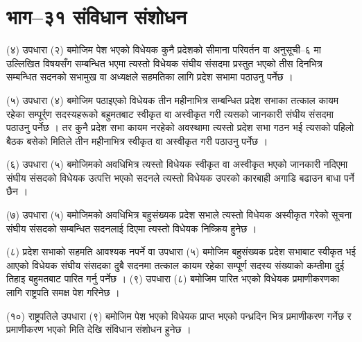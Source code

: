 \section{भाग–३१ संविधान संशोधन}

(४) उपधारा (२) बमोजिम पेश भएको विधेयक कुनै प्रदेशको सीमाना परिवर्तन वा अनुसूची–६ मा उल्लिखित विषयसँग सम्बन्धित भएमा त्यस्तो विधेयक संघीय संसदमा प्रस्तुत भएको तीस दिनभित्र सम्बन्धित सदनको सभामुख वा अध्यक्षले सहमतिका लागि प्रदेश सभामा पठाउनु पर्नेछ ।

(५) उपधारा (४) बमोजिम पठाइएको विधेयक तीन महीनाभित्र सम्बन्धित प्रदेश सभाका तत्काल कायम रहेका सम्पूर्र्ण सदस्यहरूको बहुमतबाट स्वीकृत वा अस्वीकृत गरी त्यसको जानकारी संघीय संसदमा पठाउनु पर्नेछ ।
तर कुनै प्रदेश सभा कायम नरहेको अवस्थामा त्यस्तो प्रदेश सभा गठन भई त्यसको पहिलो बैठक बसेको मितिले तीन महीनाभित्र स्वीकृत वा अस्वीकृत गरी पठाउनु पर्नेछ ।

(६) उपधारा (५) बमोजिमको अवधिभित्र त्यस्तो विधेयक स्वीकृत वा अस्वीकृत भएको जानकारी नदिएमा संघीय संसदको विधेयक उत्पत्ति भएको सदनले त्यस्तो विधेयक उपरको कारबाही अगाडि बढाउन बाधा पर्ने छैन ।

(७) उपधारा (५) बमोजिमको अवधिभित्र बहुसंख्यक प्रदेश सभाले त्यस्तो विधेयक अस्वीकृत गरेको सूचना संघीय संसदको सम्बन्धित सदनलाई दिएमा त्यस्तो विधेयक निष्क्रिय हुनेछ ।

(८) प्रदेश सभाको सहमति आवश्यक नपर्ने वा उपधारा (५) बमोजिम बहुसंख्यक प्रदेश सभाबाट स्वीकृत भई आएको विधेयक संघीय संसदका दुबै सदनमा तत्काल कायम रहेका सम्पूर्ण सदस्य संख्याको कम्तीमा दुई तिहाइ बहुमतबाट पारित गर्नु पर्नेछ ।
(९) उपधारा (८) बमोजिम पारित भएको विधेयक प्रमाणीकरणका लागि राष्ट्रपति समक्ष पेश गरिनेछ ।

(१०) राष्ट्रपतिले उपधारा (९) बमोजिम पेश भएको विधेयक प्राप्त भएको पन्ध्रदिन भित्र प्रमाणीकरण गर्नेछ र प्रमाणीकरण भएको मिति देखि संविधान संशोधन हुनेछ ।